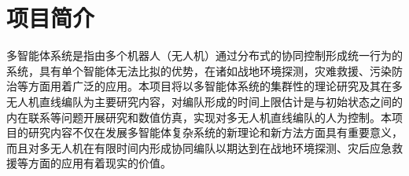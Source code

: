 
\section{项目简介}

多智能体系统是指由多个机器人（无人机）通过分布式的协同控制形成统一行为的系统，具有单个智能体无法比拟的优势，在诸如战地环境探测，灾难救援、污染防治等方面用着广泛的应用。本项目将以多智能体系统的集群性的理论研究及其在多无人机直线编队为主要研究内容，对编队形成的时间上限估计是与初始状态之间的内在联系等问题开展研究和数值仿真，实现对多无人机直线编队的人为控制。本项目的研究内容不仅在发展多智能体复杂系统的新理论和新方法方面具有重要意义，而且对多无人机在有限时间内形成协同编队以期达到在战地环境探测、灾后应急救援等方面的应用有着现实的价值。